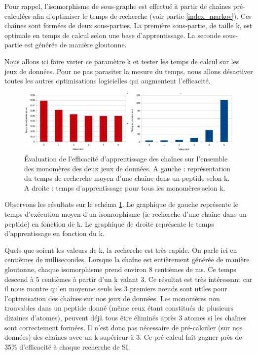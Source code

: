 Pour rappel, l'isomorphisme de sous-graphe est effectué à partir de chaînes pré-calculées afin d'optimiser le temps de recherche (voir partie \ref{index_markov}).
Ces chaînes sont formées de deux sous-parties.
La première sous-partie, de taille k, est optimale en temps de calcul selon une base d'apprentissage.
La seconde sous-partie est générée de manière gloutonne.

Nous allons ici faire varier ce paramètre k et tester les temps de calcul sur les jeux de données.
Pour ne pas parasiter la mesure du temps, nous allons désactiver toutes les autres optimisations logicielles qui augmentent l'efficacité.

\begin{figure}[!ht]
  \begin{center}
    \includegraphics[width=450px]{Figures/s2m/results/k.png}
    \caption{\label{k_graph}Évaluation de l'efficacité d'apprentissage des chaînes sur l'ensemble des monomères des deux jeux de données.
    A gauche : représentation du temps de recherche moyen d'une chaîne dans un peptide selon k.
    A droite : temps d'apprentissage pour tous les monomères selon k.}
  \end{center}
\end{figure}

Observons les résultats sur le schéma \ref{k_graph}.
Le graphique de gauche représente le temps d'exécution moyen d'un isomorphisme (ie recherche d'une chaîne dans un peptide) en fonction de k.
Le graphique de droite représente le temps d'apprentissage en fonction du k.

Quels que soient les valeurs de k, la recherche est très rapide.
On parle ici en centièmes de millisecondes.
Lorsque la chaîne est entièrement générée de manière gloutonne, chaque isomorphisme prend environ 8 centièmes de ms.
Ce temps descend à 5 centièmes à partir d'un k valant 3.
Ce résultat est très intéressant car il nous montre qu'en moyenne seuls les 3 premiers n\oe{}uds sont utiles pour l'optimisation des chaînes sur nos jeux de données.
Les monomères non trouvables dans un peptide donné (même ceux étant constitués de plusieurs dizaines d'atomes), peuvent déjà tous être éliminés après 3 atomes si les chaînes sont correctement formées.
Il n'est donc pas nécessaire de pré-calculer (sur nos données) des chaînes avec un k supérieur à 3.
Ce pré-calcul fait gagner près de 35\% d'efficacité à chaque recherche de SI.



